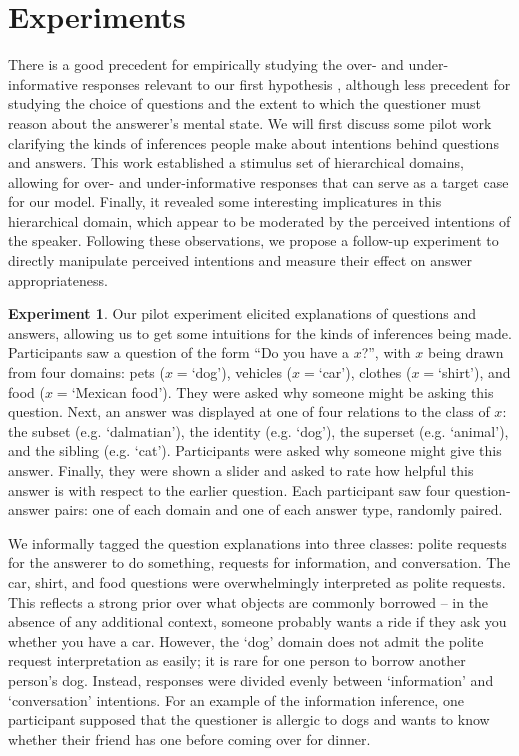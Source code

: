 \documentclass[12pt]{amsart}
\begin{document}
\section{Experiments}

There is a good precedent for empirically studying the over- and under-informative responses relevant to our first hypothesis \cite{Clark79_IndirectSpeechActs, GibbsBryant08_OptimalRelevance}, although  less precedent for studying the choice of questions and the extent to which the questioner must reason about the answerer's mental state. We will first discuss some pilot work clarifying the kinds of inferences people make about intentions behind questions and answers. This work established a stimulus set of hierarchical domains, allowing for over- and under-informative responses that can serve as a target case for our model. Finally, it revealed some interesting implicatures in this hierarchical domain, which appear to be moderated by the perceived intentions of the speaker. Following these observations, we propose a follow-up experiment to directly manipulate perceived intentions and measure their effect on answer appropriateness.

\textbf{Experiment 1}. Our pilot experiment  elicited explanations of questions and answers, allowing us to get some intuitions for the kinds of inferences being made. Participants saw a question of the form ``Do you have a $x$?'', with $x$ being drawn from four domains: pets ($x=$`dog'), vehicles ($x=$`car'), clothes ($x=$`shirt'), and food ($x=$`Mexican food'). They were asked why someone might be asking this question. Next, an answer was displayed at one of four relations to the class of $x$: the subset (e.g. `dalmatian'), the identity (e.g. `dog'), the superset (e.g. `animal'), and the sibling (e.g. `cat'). Participants were asked why someone might give this answer. Finally, they were shown a slider and asked to rate how helpful this answer is with respect to the earlier question. Each participant saw four question-answer pairs: one of each domain and one of each answer type, randomly paired. 

We informally tagged the question explanations into three classes: polite requests for the answerer to do something, requests for information, and conversation. The car, shirt, and food questions were overwhelmingly interpreted as polite requests. This reflects a strong prior over what objects are commonly borrowed -- in the absence of any additional context, someone probably wants a ride if they ask you whether you have a car. However, the `dog' domain does not admit the polite request interpretation as easily; it is rare for one person to borrow another person's dog. Instead, responses were divided evenly between `information' and `conversation' intentions. For an example of the information inference, one participant supposed that the questioner is allergic to dogs and wants to know whether their friend has one before coming over for dinner. 
\end{document}
